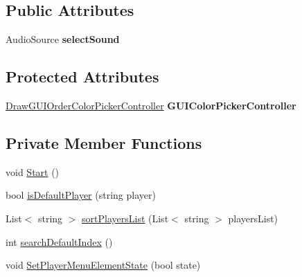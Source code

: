 \subsection*{Public Attributes}
\begin{DoxyCompactItemize}
\item 
\mbox{\label{class_player_settings_controller_a80d480e7caac18e5e682ca97fb80956d}} 
Audio\+Source {\bfseries select\+Sound}
\end{DoxyCompactItemize}
\subsection*{Protected Attributes}
\begin{DoxyCompactItemize}
\item 
\mbox{\label{class_player_settings_controller_a5f039722316553dbdb848b2a4fbe7de5}} 
\mbox{\hyperlink{class_draw_g_u_i_order_color_picker_controller}{Draw\+G\+U\+I\+Order\+Color\+Picker\+Controller}} {\bfseries G\+U\+I\+Color\+Picker\+Controller}
\end{DoxyCompactItemize}
\subsection*{Private Member Functions}
\begin{DoxyCompactItemize}
\item 
void \mbox{\hyperlink{class_player_settings_controller_aa62d29bfebe427df3951c7ff39a74d32}{Start}} ()
\item 
bool \mbox{\hyperlink{class_player_settings_controller_ad7ff775d3b7ebffcb9f463e14efdd9eb}{is\+Default\+Player}} (string player)
\item 
List$<$ string $>$ \mbox{\hyperlink{class_player_settings_controller_aa9ae4f47bc49df25568a835f31bbe194}{sort\+Players\+List}} (List$<$ string $>$ players\+List)
\item 
int \mbox{\hyperlink{class_player_settings_controller_a57c256b9b32c27813343f9cb6abbf31b}{search\+Default\+Index}} ()
\item 
void \mbox{\hyperlink{class_player_settings_controller_a2addada474e098c01b6a99c0a64ae465}{Set\+Player\+Menu\+Element\+State}} (bool state)
\end{DoxyCompactItemize}
